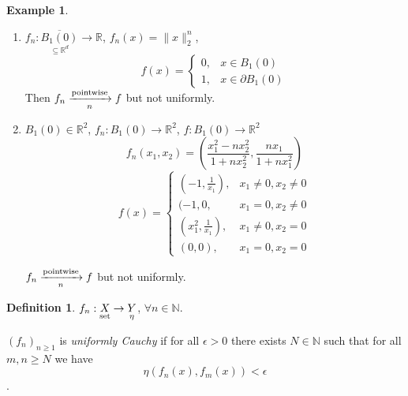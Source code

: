 \documentclass[12pt]{amsbook}
\theoremstyle{definition}
\newtheorem{definition}[theorem]{Definition}
\newtheorem{example}[theorem]{Example}
\newcommand{\NN}{{\mathbb N}}
\newcommand{\RR}{{\mathbb R}}
\newcommand{\ra}{\rightarrow} %
\begin{document}
\begin{example}
\begin{enumerate}
\item $f_n: \underset{\subseteq \RR^d}{\overline{B_1(0)}} \ra \RR$, $f_n(x) = \|x\|^n_2$,
\begin{equation*}
f(x)=\left\{\begin{array}{ll}{0,} & {x \in B_1(0)} \\ {1,} & {x \in \partial B_1(0)}\end{array}\right.
\end{equation*}
Then $f_n \xrightarrow[n]{\textup{pointwise}} f$ but not uniformly.

\item $B_1(0) \in \RR^2$, $f_n : B_1(0) \ra \RR^2$, $f : B_1(0) \ra \RR^2$
\begin{equation*}
f_n(x_1, x_2) = \left(\frac{x_1^2-nx_2^2}{1+nx_2^2}, \frac{nx_1}{1+nx_1^2}\right)
\end{equation*}
\begin{equation*}
f(x)=\left\{\begin{array}{ll}
{(-1, \frac{1}{x_1}),} & {x_1 \neq 0, x_2 \neq 0} \\ 
{(-1, 0,} & {x_1 = 0, x_2 \neq 0} \\ 
{(x_1^2, \frac{1}{x_1}),} & {x_1 \neq 0, x_2 = 0} \\ 
{(0,0),} & {x_1 = 0, x_2 = 0} 
\end{array}\right.
\end{equation*}

$f_n \xrightarrow[n]{\textup{pointwise}} f$ but not uniformly.
\end{enumerate}
\end{example}


\begin{definition}
$f_n: \underset{\textup{set}}X \ra \underset{\eta}Y$, $\forall n \in \NN$.

$(f_n)_{n \geq 1}$ is \emph{uniformly Cauchy} if for all $\epsilon > 0$ there exists $N \in \NN$ such that for all $m, n \geq N$ we have 
\begin{equation*}\eta(f_n(x), f_m(x)) < \epsilon\end{equation*}.
\end{definition}
\end{document}
